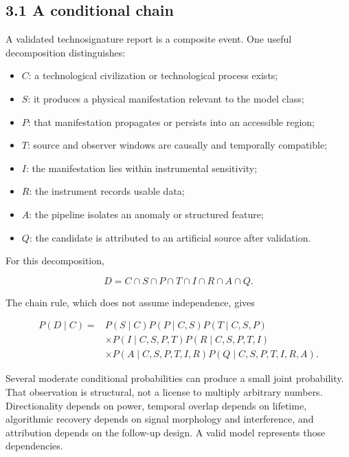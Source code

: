 \documentclass[11pt,a4paper]{article}
\begin{document}
\subsection{3.1 A conditional chain}\label{31-a-conditional-chain}

A validated technosignature report is a composite event. One useful decomposition distinguishes:

\begin{itemize}
\item
  \(C\): a technological civilization or technological process exists;
\item
  \(S\): it produces a physical manifestation relevant to the model class;
\item
  \(P\): that manifestation propagates or persists into an accessible region;
\item
  \(T\): source and observer windows are causally and temporally compatible;
\item
  \(I\): the manifestation lies within instrumental sensitivity;
\item
  \(R\): the instrument records usable data;
\item
  \(A\): the pipeline isolates an anomaly or structured feature;
\item
  \(Q\): the candidate is attributed to an artificial source after validation.
\end{itemize}

For this decomposition,

\begin{equation}
D = C\cap S\cap P\cap T\cap I\cap R\cap A\cap Q.
\end{equation}

The chain rule, which does not assume independence, gives

\begin{equation}
\begin{aligned}
P(D\mid C) ={}& P(S\mid C) P(P\mid C,S) P(T\mid C,S,P)\\
&\times P(I\mid C,S,P,T) P(R\mid C,S,P,T,I)\\
&\times P(A\mid C,S,P,T,I,R) P(Q\mid C,S,P,T,I,R,A).
\end{aligned}
\end{equation}

Several moderate conditional probabilities can produce a small joint probability. That observation is structural, not a license to multiply arbitrary numbers. Directionality depends on power, temporal overlap depends on lifetime, algorithmic recovery depends on signal morphology and interference, and attribution depends on the follow-up design. A valid model represents those dependencies.
\end{document}
